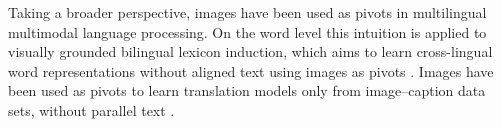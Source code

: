 Taking a broader perspective, images have been used as pivots in multilingual multimodal language processing. On the word level this intuition is 
applied to visually grounded bilingual lexicon induction, which aims to learn 
cross-lingual word representations without aligned text using images as pivots
\cite{bergsma2011learning,kiela2015visual,vulic2016multi,hartmann2017limitations,hewitt2018learning}. Images have been used as pivots to learn translation models only from image--caption
data sets, without parallel text \cite{hitschler2016multimodal,nakayama2017zero,lee2017emergent,chen2018zero}.



